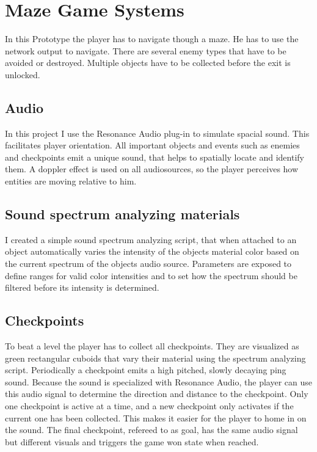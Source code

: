
\chapter{Maze Game Systems}\label{MazeGameSystems}
 In this Prototype the player has to navigate though a maze. He has to use the network output to navigate. There are several enemy types that have to be avoided or destroyed. Multiple objects have to be collected before the exit is unlocked.

\section{Audio}
In this project I use the Resonance Audio plug-in to simulate spacial sound. This facilitates player orientation. All important objects and events such as enemies and checkpoints emit a unique sound, that helps to spatially locate and identify them. A doppler effect is used on all audiosources, so the player perceives how entities are moving relative to him.



\section{Sound spectrum analyzing materials}
I created a simple sound spectrum analyzing script, that when attached to an object automatically varies the intensity of the objects material color based on the current spectrum of the objects audio source. Parameters are exposed to define ranges for valid color intensities and to set how the spectrum should be filtered before its intensity is determined.



\section{Checkpoints}
To beat a level the player has to collect all checkpoints. They are visualized as green rectangular cuboids that vary their material using the spectrum analyzing script. Periodically a checkpoint emits a high pitched, slowly decaying ping sound. Because the sound is specialized with Resonance Audio, the player can use this audio signal to determine the direction and distance to the checkpoint. Only one checkpoint is active at a time, and a new checkpoint only activates if the current one has been collected. This makes it easier for the player to home in on the sound. The final checkpoint, refereed to as goal, has the same audio signal but different visuals and triggers the game won state when reached.


